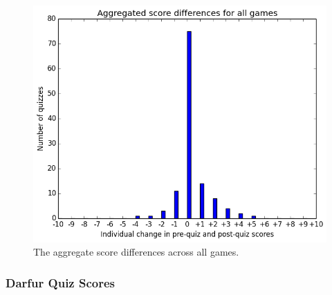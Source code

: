 			\begin{figure}[h] 
			\centering 
			\includegraphics[width=\textwidth]{general_results.png} 
			\caption{The aggregate score differences across all games.}
			\end{figure}

	\cleardoublepage

		\subsubsection{Darfur Quiz Scores}

